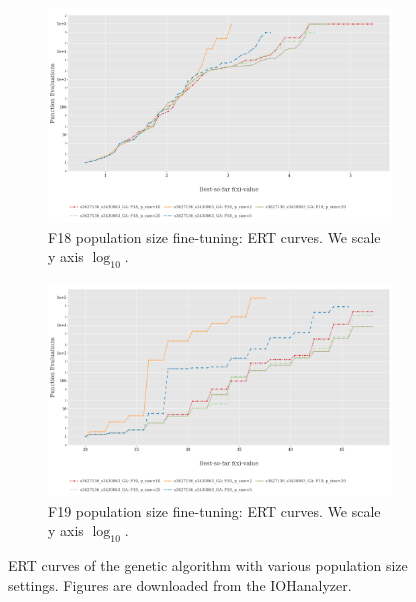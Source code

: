 \documentclass{article}
\begin{document}
\begin{figure}[!ht]
    \begin{subfigure}[h]{0.95\linewidth}
        \includegraphics[width=\linewidth]{ga/f18/psize_ert.png}
        \caption{F18 population size fine-tuning: ERT curves. We scale y axis $\log_{10}$.}
    \end{subfigure}
    \hfill
    \begin{subfigure}[h]{0.95\linewidth}
        \includegraphics[width=\linewidth]{ga/f19/psize_ert.png}
        \caption{F19 population size fine-tuning: ERT curves. We scale y axis $\log_{10}$.}
    \end{subfigure}
    \caption{ERT curves of the genetic algorithm with various population size settings. Figures are downloaded from the IOHanalyzer.}
    \label{fig:experi-ga-psize-ert}
\end{figure}
\end{document}
